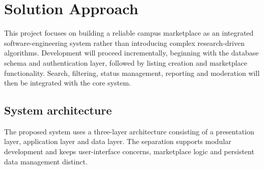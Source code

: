 \documentclass[11pt,a4paper]{article}
\begin{document}

\section{Solution Approach}

This project focuses on building a reliable campus marketplace as
an integrated software-engineering system rather than introducing
complex research-driven algorithms. Development will proceed
incrementally, beginning with the database schema and authentication
layer, followed by listing creation and marketplace functionality.
Search, filtering, status management, reporting and moderation will
then be integrated with the core system.


\subsection{System architecture}

The proposed system uses a three-layer architecture consisting of a
presentation layer, application layer and data layer. The separation
supports modular development and keeps user-interface concerns,
marketplace logic and persistent data management distinct.

\end{document}
